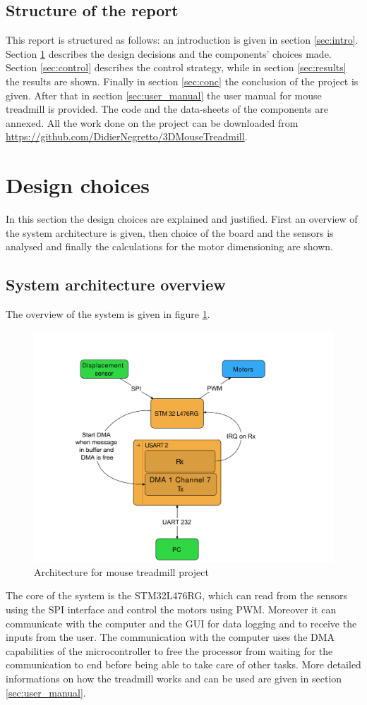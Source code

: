 \documentclass[12pt,a4paper, twoside]{article}
\begin{document}
\subsection{Structure of the report}
This report is structured as follows: an introduction is given in section \ref{sec:intro}. Section \ref{sec:design} describes the design decisions and the components' choices made. Section \ref{sec:control} describes the control strategy, while in section \ref{sec:results} the results are shown.
Finally in section \ref{sec:conc} the conclusion of the project is given. After that in section \ref{sec:user_manual} the user manual for mouse treadmill is provided. The code and the data-sheets of the components are annexed. All the work done on the project can be downloaded from \url{https://github.com/DidierNegretto/3DMouseTreadmill}.
\section{Design choices}\label{sec:design}
In this section the design choices are explained and justified. First an overview of the system architecture is given, then choice of the board and the sensors is analysed and finally the calculations for the motor dimensioning are shown.
\subsection{System architecture overview} \label{sec:archi}
The overview of the system is given in figure \ref{fig:arch}.
\begin{figure}[H]
	\centering
	\includegraphics[width=0.9\linewidth]{fig/archi.pdf}
	\caption{Architecture for mouse treadmill project}
	\label{fig:arch}
\end{figure}
The core of the system is the STM32L476RG, which can read from the sensors using the SPI interface and control the motors using PWM. Moreover it can communicate with the computer and the GUI for data logging and to receive the inputs from the user. The communication with the computer uses the DMA capabilities of the microcontroller to free the processor from waiting for the communication to end before being able to take care of other tasks. More detailed informations on how the treadmill works and can be used are given in section \ref{sec:user_manual}.
\end{document}
